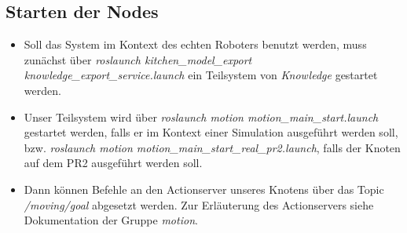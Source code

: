 \documentclass{suturo}
\begin{document}
\subsection{Starten der Nodes}
\begin{itemize}

\item Soll das System im Kontext des echten Roboters benutzt werden, muss zunächst über \textit{roslaunch kitchen\_model\_export knowledge\_export\_service.launch} ein Teilsystem von \textit{Knowledge} gestartet werden.

\item Unser Teilsystem wird über \textit{roslaunch motion motion\_main\_start.launch} gestartet werden, falls er im Kontext einer Simulation ausgeführt werden soll, bzw. \textit{roslaunch motion motion\_main\_start\_real\_pr2.launch}, falls der Knoten auf dem PR2 ausgeführt werden soll.

\item Dann können Befehle an den Actionserver unseres Knotens über das Topic \textit{/moving/goal} abgesetzt werden. Zur Erläuterung des Actionservers siehe Dokumentation der Gruppe \textit{motion}.
\end{itemize}
\end{document}
